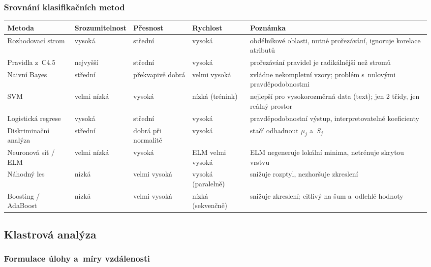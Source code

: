 \documentclass[11pt,a4paper]{article}
\theoremstyle{definition}
\begin{document}
\subsubsection{Srovnání klasifikačních metod}

\begin{center}
\small
\begin{tabular}{@{}p{2.9cm}p{2.3cm}p{2.2cm}p{2.3cm}p{4.6cm}@{}}
\toprule
\textbf{Metoda} & \textbf{Srozumitel\-nost} & \textbf{Přesnost} & \textbf{Rychlost}
  & \textbf{Poznámka} \\
\midrule
Rozhodovací strom & vysoká & střední & vysoká & obdélníkové oblasti, nutné prořezávání,
  ignoruje korelace atributů \\
Pravidla z~C4.5 & nejvyšší & střední & vysoká & prořezávání pravidel je radikálnější než
  stromů \\
Naivní Bayes & střední & překvapivě dobrá & velmi vysoká & zvládne nekompletní vzory;
  problém s~nulovými pravděpodobnostmi \\
SVM & velmi nízká & vysoká & nízká (trénink) & nejlepší pro vysokorozměrná data (text);
  jen 2 třídy, jen reálný prostor \\
Logistická regrese & vysoká & střední & vysoká & pravděpodobnostní výstup,
  interpretovatelné koeficienty \\
Diskriminační analýza & střední & dobrá při normalitě & vysoká & stačí odhadnout
  $\mu_j$ a~$S_j$ \\
Neuronová síť / ELM & velmi nízká & vysoká & ELM velmi vysoká & ELM negeneruje lokální
  minima, netrénuje skrytou vrstvu \\
Náhodný les & nízká & velmi vysoká & vysoká (paralelně) & snižuje rozptyl, nezhoršuje
  zkreslení \\
Boosting / AdaBoost & nízká & velmi vysoká & nízká (sekvenčně) & snižuje zkreslení; citlivý
  na šum a~odlehlé hodnoty \\
\bottomrule
\end{tabular}
\end{center}

\subsection{Klastrová analýza}
\label{ssec:clustering}

\subsubsection{Formulace úlohy a~míry vzdálenosti}
\end{document}
